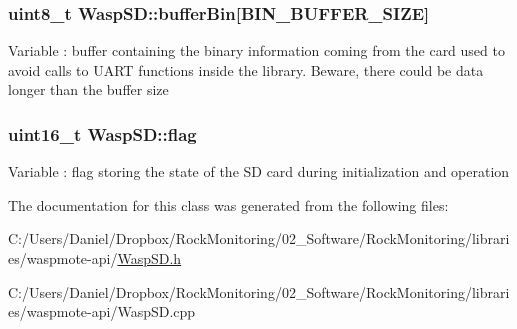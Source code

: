 \subsubsection[{\texorpdfstring{buffer\+Bin}{bufferBin}}]{\setlength{\rightskip}{0pt plus 5cm}uint8\+\_\+t Wasp\+S\+D\+::buffer\+Bin\mbox{[}{\bf B\+I\+N\+\_\+\+B\+U\+F\+F\+E\+R\+\_\+\+S\+I\+ZE}\mbox{]}}\hypertarget{class_wasp_s_d_a30858d4ea20d8f577bdda334f9fefaa9}{}\label{class_wasp_s_d_a30858d4ea20d8f577bdda334f9fefaa9}
Variable \+: buffer containing the binary information coming from the card used to avoid calls to U\+A\+RT functions inside the library. Beware, there could be data longer than the buffer size 
\subsubsection[{\texorpdfstring{flag}{flag}}]{\setlength{\rightskip}{0pt plus 5cm}uint16\+\_\+t Wasp\+S\+D\+::flag}\hypertarget{class_wasp_s_d_a8ca1aac8727a742cddb33e677c71faef}{}\label{class_wasp_s_d_a8ca1aac8727a742cddb33e677c71faef}
Variable \+: flag storing the state of the SD card during initialization and operation 

The documentation for this class was generated from the following files\+:\begin{DoxyCompactItemize}
\item 
C\+:/\+Users/\+Daniel/\+Dropbox/\+Rock\+Monitoring/02\+\_\+\+Software/\+Rock\+Monitoring/libraries/waspmote-\/api/\hyperlink{_wasp_s_d_8h}{Wasp\+S\+D.\+h}\item 
C\+:/\+Users/\+Daniel/\+Dropbox/\+Rock\+Monitoring/02\+\_\+\+Software/\+Rock\+Monitoring/libraries/waspmote-\/api/Wasp\+S\+D.\+cpp\end{DoxyCompactItemize}
